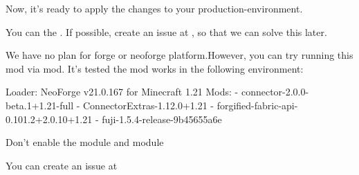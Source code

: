 Now, it's ready to apply the changes to your production-environment.


You can  the .
If possible, create an issue at \issueurl, so that we can solve this later.

We have no plan for forge or neoforge platform.However, you can try running this mod via  mod.
It's tested the mod works in the following environment:
\begin{sh}
    Loader: NeoForge v21.0.167 for Minecraft 1.21
    Mods:
    - connector-2.0.0-beta.1+1.21-full
    - ConnectorExtras-1.12.0+1.21
    - forgified-fabric-api-0.101.2+2.0.10+1.21
    - fuji-1.5.4-release-9b45655a6e
\end{sh}
Don't enable the  module and  module


You can create an issue at \issueurl



